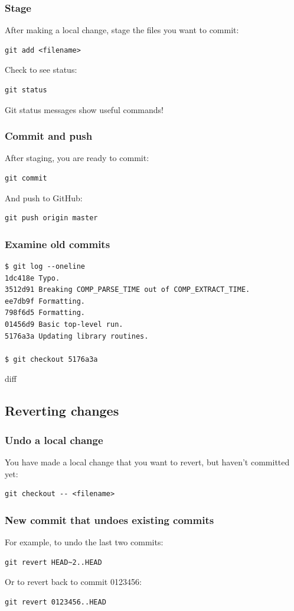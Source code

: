 \documentclass{beamer}
\begin{document}
\begin{frame}[fragile]
  \frametitle{Stage}
After making a local change, stage the files you want to commit:
  \begin{lstlisting}
git add <filename>
  \end{lstlisting}
Check to see status:
  \begin{lstlisting}
git status
  \end{lstlisting}
Git status messages show useful commands!
\end{frame}

\begin{frame}[fragile]
  \frametitle{Commit and push}
After staging, you are ready to commit:
  \begin{lstlisting}
git commit
  \end{lstlisting}
And push to GitHub:
  \begin{lstlisting}
git push origin master
  \end{lstlisting}
\end{frame}

\begin{frame}[fragile]
  \frametitle{Examine old commits}
  \begin{small}
  \begin{lstlisting}
$ git log --oneline
1dc418e Typo.
3512d91 Breaking COMP_PARSE_TIME out of COMP_EXTRACT_TIME.
ee7db9f Formatting.
798f6d5 Formatting.
01456d9 Basic top-level run.
5176a3a Updating library routines.

$ git checkout 5176a3a
  \end{lstlisting}
  \end{small}
\end{frame}

\begin{frame}[]
  diff
\end{frame}

\subsection{Reverting changes}
\begin{frame}[fragile]
  \frametitle{Undo a local change}
You have made a local change that you want to revert, but haven't committed yet:
  \begin{lstlisting}
git checkout -- <filename>
  \end{lstlisting}
\end{frame}

\begin{frame}[fragile]
  \frametitle{New commit that undoes existing commits}
For example, to undo the last two commits:
  \begin{lstlisting}
git revert HEAD~2..HEAD
  \end{lstlisting}
Or to revert back to commit 0123456:
  \begin{lstlisting}
git revert 0123456..HEAD
  \end{lstlisting}
\end{frame}
\end{document}
